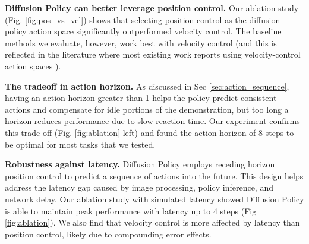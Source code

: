 \textbf{Diffusion Policy can better leverage position control.}
\label{sec:eval_pos_vs_vel}
Our ablation study (Fig. \ref{fig:pos_vs_vel}) shows that selecting position control as the diffusion-policy action space significantly outperformed velocity control. The baseline methods we evaluate, however, work best with velocity control (and this is reflected in the literature where most existing work reports using velocity-control action spaces \cite{robomimic, bet, zhang2018deep, florence2019self, mandlekar2020learning, mandlekar2020iris}).



\textbf{The tradeoff in action horizon.}
As discussed in Sec \ref{sec:action_sequence}, 
having an action horizon greater than 1 helps the policy predict consistent actions and compensate for idle portions of the demonstration, but too long a horizon reduces performance due to slow reaction time. Our experiment confirms this trade-off (Fig. \ref{fig:ablation} left) and found the action horizon of 8 steps to be optimal for most tasks that we tested. 

\textbf{Robustness against latency.}
Diffusion Policy employs receding horizon position control to predict a sequence of actions into the future. This design helps address the latency gap caused by image processing, policy inference, and network delay. Our ablation study with simulated latency showed Diffusion Policy is able to maintain peak performance with latency up to 4 steps (Fig \ref{fig:ablation}). We also find that velocity control is more affected by latency than position control, likely due to compounding error effects.

